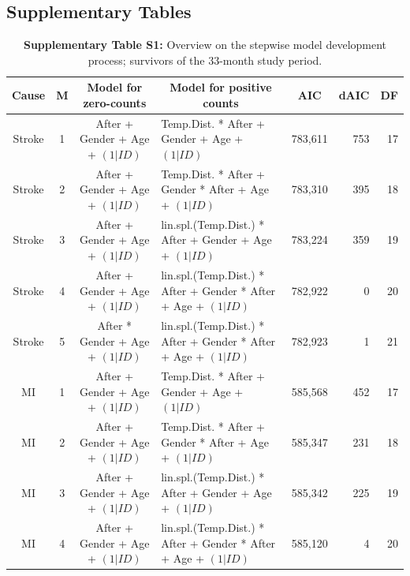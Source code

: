 

\newpage

	
\subsection{Supplementary Tables}


\begin{landscape}

\begin{table}[htbp]
  \centering
  \small
  \caption*{\textbf{Supplementary Table S1:}	Overview on the stepwise model development 
 												process; survivors of the 33-month study period.}    
  \begin{tabular}{ccclrrr}
    \toprule
    \textbf{Cause} & \textbf{M} & \textbf{Model for zero-counts } & \multicolumn{1}{c}{\textbf{Model for positive counts}} & \multicolumn{1}{c}{\textbf{AIC}} & \multicolumn{1}{c}{\textbf{dAIC}} & \multicolumn{1}{c}{\textbf{DF}} \\
    \midrule
    Stroke & 1     & After + Gender + Age + $(1|ID)$ & Temp.Dist. * After + Gender + Age + $(1|ID)$ & 783,611 & 753   & 17 \\
    Stroke & 2     & After + Gender + Age + $(1|ID)$ & Temp.Dist. * After + Gender * After + Age + $(1|ID)$ & 783,310 & 395   & 18 \\
    Stroke & 3     & After + Gender + Age + $(1|ID)$ & lin.spl.(Temp.Dist.) * After + Gender + Age + $(1|ID)$ & 783,224 & 359   & 19 \\
    Stroke & 4     & After + Gender + Age + $(1|ID)$ & lin.spl.(Temp.Dist.) * After + Gender * After + Age + $(1|ID)$ & 782,922 & 0     & 20 \\
    Stroke & 5     & After * Gender + Age + $(1|ID)$ & lin.spl.(Temp.Dist.) * After + Gender * After + Age + $(1|ID)$ & 782,923 & 1     & 21 \\
    MI    & 1     & After + Gender + Age + $(1|ID)$ & Temp.Dist. * After + Gender + Age + $(1|ID)$ & 585,568 & 452   & 17 \\
    MI    & 2     & After + Gender + Age + $(1|ID)$ & Temp.Dist. * After + Gender * After + Age + $(1|ID)$ & 585,347 & 231   & 18 \\
    MI    & 3     & After + Gender + Age + $(1|ID)$ & lin.spl.(Temp.Dist.) * After + Gender + Age + $(1|ID)$ & 585,342 & 225   & 19 \\
    MI    & 4     & After + Gender + Age + $(1|ID)$ & lin.spl.(Temp.Dist.) * After + Gender * After + Age + $(1|ID)$ & 585,120 & 4     & 20 \\

\end{tabular}
\end{table}
\end{landscape}
